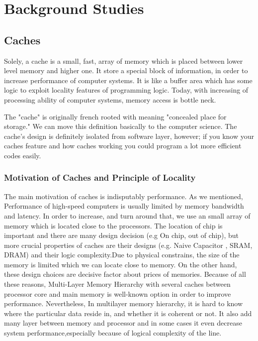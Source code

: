 \chapter{Background Studies}
\section{Caches}
Solely, a cache is a small, fast, array of memory which is placed between lower level memory and higher one.  It store a special block of information, in order to increase performance of computer systems. It is like a buffer area which has some logic to exploit locality features of programming logic. Today, with increasing of processing ability of computer systems, memory access is bottle neck. 

The "cache" is originally french rooted with meaning "concealed place for storage."\cite{sloss2004arm} We can move this definition basically to the computer science. The cache's design is definitely  isolated from software layer, however; if you know your caches feature and how caches working you could program a lot more efficient codes easily.



\subsection{Motivation of Caches and Principle of Locality}
The main motivation of caches is indisputably performance. As we mentioned,  Performance of high-speed computers is usually limited by memory bandwidth and latency. In order to increase, and turn around that, we use an small array of memory which is located close to the processors.  The location of chip is important and there are many design decision (e.g On chip, out of chip), but more crucial  properties of caches are their designs (e.g. Naive Capacitor , SRAM, DRAM) and their logic complexity\cite{hennessy2012computer}.Due to physical constrains, the size of the memory is limited which we can locate close to memory. On the other hand, these design choices are decisive factor about prices of memories.  Because of all these reasons, Multi-Layer Memory Hierarchy with several caches  between processor core and main memory is well-known option in order to improve performance. Nevertheless, In multilayer memory hierarchy, it is hard to know where the particular data reside in, and whether it is coherent or not. It also add many layer between memory and processor and in some cases it even decrease system performance,especially because of logical complexity of the line.

